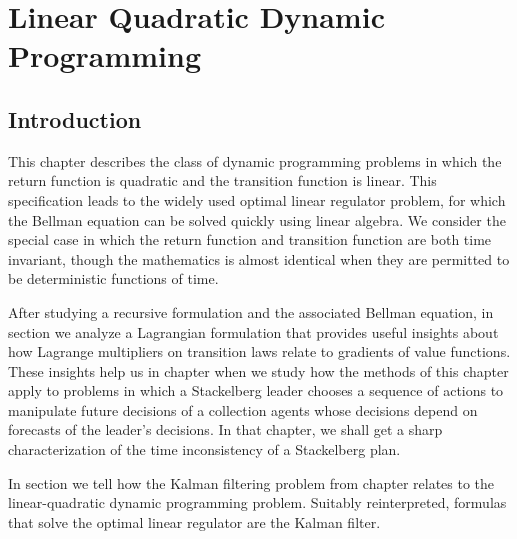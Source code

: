 

%

%

\hbox{}

\def\toone{{t+1}}
\def\ttwo{{t+2}}
\def\tthree{{t+3}}
\def\Tone{{T+1}}
\def\TTT{{T-1}}
\def\rtr{{\rm tr}}
\def\be{{\beta}}
\def\eps{{\epsilon}}

\chapter{Linear Quadratic Dynamic Programming\label{dplinear}}

\section{Introduction}

This chapter describes the class of dynamic programming
problems in which the return function  is quadratic and
the transition function is linear.  This specification
leads to the widely used optimal linear regulator problem,
for which the Bellman equation can
be solved quickly   using linear algebra.
  We consider the special case in which the
return function  and transition function  are both time
invariant, though the mathematics is almost identical when they are
permitted to be deterministic functions of time.
%

After studying a recursive formulation and the associated Bellman equation,
in section  we analyze a Lagrangian formulation that provides
useful insights about  how Lagrange multipliers on transition laws relate to
 gradients of  value functions.  These insights help us in chapter 
when we study how the methods of this chapter apply to problems in which  a Stackelberg leader chooses a sequence of actions
 to manipulate
future  decisions of a collection agents whose decisions depend on forecasts of the leader's decisions.
In that chapter, we shall get a sharp characterization of the time inconsistency of a Stackelberg plan.

  In section  we tell how the Kalman  filtering problem from chapter 
relates to the linear-quadratic dynamic programming problem.  Suitably reinterpreted,
formulas that solve the optimal linear regulator are
the Kalman filter.
%


